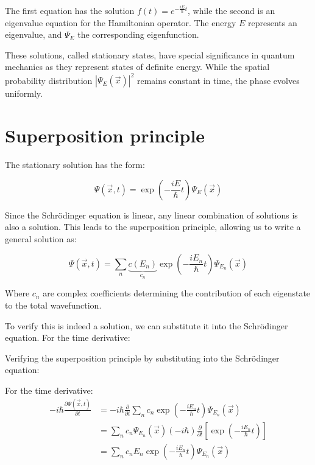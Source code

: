 The first equation has the solution $f(t) = e^{-\frac{iE}{\hbar}t}$, while the second is an eigenvalue equation for the Hamiltonian operator. The energy $E$ represents an eigenvalue, and $\Psi_E$ the corresponding eigenfunction.

These solutions, called stationary states, have special significance in quantum mechanics as they represent states of definite energy. While the spatial probability distribution $|\Psi_E(\vec{x})|^2$ remains constant in time, the phase evolves uniformly.

\section{Superposition principle}

The stationary solution has the form:

\begin{equation}
\Psi(\vec{x}, t) = \exp\left(-\frac{iE}{\hbar}t\right)\Psi_E(\vec{x})
\end{equation}

Since the Schrödinger equation is linear, any linear combination of solutions is also a solution. This leads to the superposition principle, allowing us to write a general solution as:

\begin{equation}
\Psi(\vec{x}, t) = \sum_n \underbrace{c(E_n)}_{c_n}\exp\left(-\frac{iE_n}{\hbar}t\right)\Psi_{E_n}(\vec{x})
\end{equation}

Where $c_n$ are complex coefficients determining the contribution of each eigenstate to the total wavefunction.

To verify this is indeed a solution, we can substitute it into the Schrödinger equation. For the time derivative:


Verifying the superposition principle by substituting into the Schrödinger equation:

For the time derivative:
\begin{align}
-i\hbar\frac{\partial\Psi(\vec{x},t)}{\partial t} &= -i\hbar\frac{\partial}{\partial t}\sum_n c_n\exp\left(-\frac{iE_n}{\hbar}t\right)\Psi_{E_n}(\vec{x}) \\
&= \sum_n c_n\Psi_{E_n}(\vec{x})(-i\hbar)\frac{\partial}{\partial t}\left[\exp\left(-\frac{iE_n}{\hbar}t\right)\right] \label{eq:2.7} \\
&= \sum_n c_nE_n\exp\left(-\frac{iE_n}{\hbar}t\right)\Psi_{E_n}(\vec{x})
\end{align}

